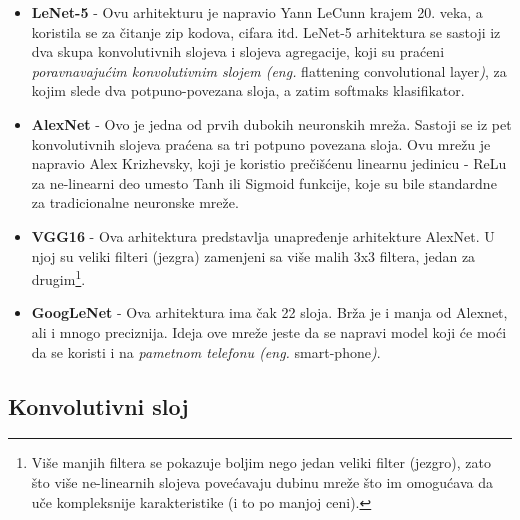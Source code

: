 \documentclass[a4paper]{article}
\begin{document}
\begin{itemize}

\item \textbf{LeNet-5} - Ovu arhitekturu je napravio Yann LeCunn krajem 20. veka, a koristila se za čitanje zip kodova, cifara itd. LeNet-5 arhitektura se sastoji iz dva skupa konvolutivnih slojeva i slojeva agregacije, koji su praćeni \textit{poravnavajućim konvolutivnim slojem (eng.} flattening convolutional layer\textit{)}, za kojim slede dva potpuno-povezana sloja, a zatim softmaks klasifikator.

\item \textbf{AlexNet} - Ovo je jedna od prvih dubokih neuronskih mreža. Sastoji se iz pet konvolutivnih slojeva praćena sa tri potpuno povezana sloja. Ovu mrežu je napravio Alex Krizhevsky, koji je koristio prečišćenu linearnu jedinicu - ReLu za ne-linearni deo umesto Tanh ili Sigmoid funkcije, koje su bile standardne za tradicionalne neuronske mreže.

\item \textbf{VGG16} - Ova arhitektura predstavlja unapređenje arhitekture AlexNet. U njoj su veliki filteri (jezgra) zamenjeni sa više malih 3x3 filtera, jedan za drugim\footnote{Više manjih filtera se pokazuje boljim nego jedan veliki filter (jezgro), zato što više ne-linearnih slojeva povećavaju dubinu mreže što im omogućava da uče kompleksnije karakteristike (i to po manjoj ceni).}.


\item \textbf{GoogLeNet} - Ova arhitektura ima čak 22 sloja. Brža je i manja od Alexnet, ali i mnogo preciznija. Ideja ove mreže jeste da se napravi model koji će moći da se koristi i na \textit{pametnom telefonu (eng.} smart-phone\textit{)}.

\end{itemize}


\subsection{Konvolutivni sloj}
\label{konvolucija}
\end{document}
